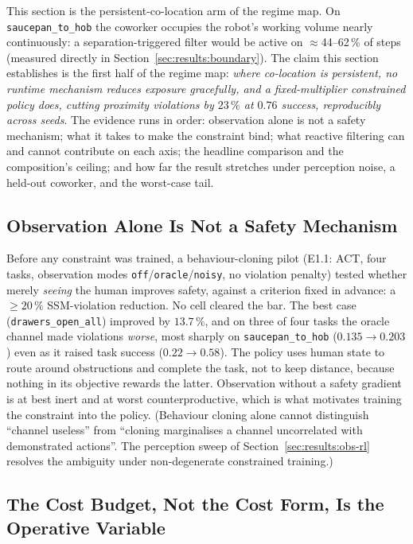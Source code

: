 \documentclass[11pt,a4paper]{report}
\newcommand{\ssm}{SSM}
\begin{document}
This section is the persistent-co-location arm of the regime map. On
\texttt{saucepan\_to\_hob} the coworker occupies the robot's working
volume nearly continuously: a separation-triggered filter would be
active on $\approx$44--62\,\% of steps (measured directly in
Section~\ref{sec:results:boundary}). The claim this section
establishes is the first half of the regime map: \emph{where
co-location is persistent, no runtime mechanism reduces exposure
gracefully, and a fixed-multiplier constrained policy does, cutting
proximity violations by $23\,\%$ at $0.76$ success, reproducibly
across seeds}. The evidence runs in order: observation alone is not
a safety mechanism; what it takes to make the constraint bind; what
reactive filtering can and cannot contribute on each axis; the
headline comparison and the composition's ceiling; and how far the
result stretches under perception noise, a held-out coworker, and
the worst-case tail.

\subsection{Observation Alone Is Not a Safety Mechanism}
\label{sec:results:obs-bc}

Before any constraint was trained, a behaviour-cloning pilot (E1.1:
ACT, four tasks, observation modes
\texttt{off}/\texttt{oracle}/\texttt{noisy}, no violation penalty)
tested whether merely \emph{seeing} the human improves safety,
against a criterion fixed in advance: a $\geq 20\,\%$
\ssm{}-violation reduction. No cell cleared the bar. The best case
(\texttt{drawers\_open\_all}) improved by $13.7\,\%$, and on three of
four tasks the oracle channel made violations \emph{worse}, most
sharply on \texttt{saucepan\_to\_hob} ($0.135 \to 0.203$) even as it
raised task success ($0.22 \to 0.58$). The policy uses human state
to route around obstructions and complete the task, not to keep
distance, because nothing in its objective rewards the latter.
Observation without a safety gradient is at best inert and at worst
counterproductive, which is what motivates training the constraint
into the policy. (Behaviour cloning alone cannot distinguish
``channel useless'' from ``cloning marginalises a channel
uncorrelated with demonstrated actions''. The perception sweep of
Section~\ref{sec:results:obs-rl} resolves the ambiguity under
non-degenerate constrained training.)

\subsection{The Cost Budget, Not the Cost Form, Is the Operative Variable}
\label{sec:results:cost-signal}
\label{sec:results:budget}
\end{document}
